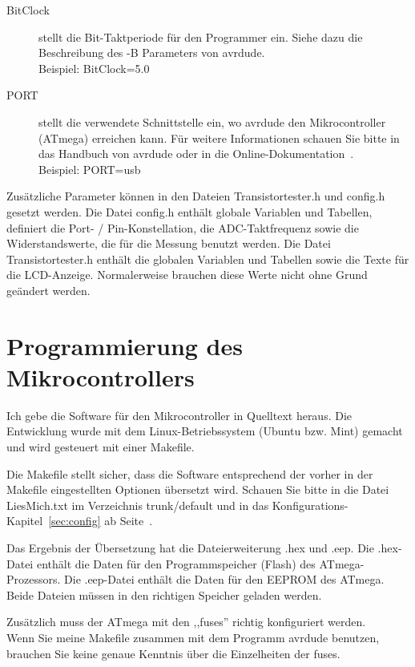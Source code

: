 \begin{description}
  \item[BitClock] stellt die Bit-Taktperiode für den Programmer ein. Siehe dazu die Beschreibung des -B Parameters von avrdude.\\
Beispiel: BitClock=5.0

  \item[PORT] stellt die verwendete Schnittstelle ein, wo avrdude den Mikrocontroller (ATmega) erreichen kann.
  Für weitere Informationen schauen Sie bitte in das Handbuch von avrdude oder in die Online-Dokumentation~\cite{avrdude}.\\
Beispiel: PORT=usb

\end{description}

Zusätzliche Parameter können in den Dateien Transistortester.h und config.h gesetzt werden.
Die Datei config.h enthält globale Variablen und Tabellen, definiert die Port- / Pin-Konstellation,
die ADC-Taktfrequenz sowie die Widerstandswerte, die für die Messung benutzt werden.
Die Datei Transistortester.h enthält die globalen Variablen und Tabellen sowie die Texte für die LCD-Anzeige.
Normalerweise brauchen diese Werte nicht ohne Grund geändert werden.


\section{Programmierung des Mikrocontrollers}
Ich gebe die Software für den Mikrocontroller in Quelltext heraus.
Die Entwicklung wurde mit dem Linux-Betriebssystem (Ubuntu bzw. Mint) gemacht
und wird gesteuert mit einer Makefile.

Die Makefile stellt sicher, dass die Software entsprechend der vorher in der Makefile 
eingestellten Optionen übersetzt wird. Schauen Sie bitte in die Datei LiesMich.txt
im Verzeichnis trunk/default und in das Konfigurations-Kapitel~\ref{sec:config} ab Seite~\pageref{sec:config}.

Das Ergebnis der Übersetzung hat die Dateierweiterung .hex und .eep.
Die .hex-Datei enthält die Daten für den Programmspeicher (Flash) des ATmega-Prozessors.
Die .eep-Datei enthält die Daten für den EEPROM des ATmega.\\
Beide Dateien müssen in den richtigen Speicher geladen werden.

Zusätzlich muss der ATmega mit den ,,fuses'' richtig konfiguriert werden.\\
Wenn Sie meine Makefile zusammen mit dem Programm avrdude \cite{avrdude} benutzen, brauchen Sie
keine genaue Kenntnis über die Einzelheiten der fuses.

